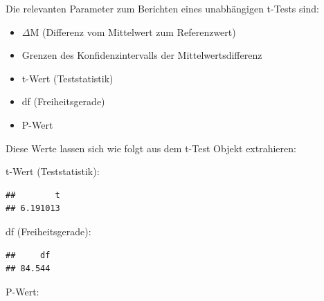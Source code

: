 \documentclass[
]{book}
\newenvironment{Shaded}{\begin{snugshade}}{\end{snugshade}}
\newcommand{\AttributeTok}[1]{\textcolor[rgb]{0.77,0.63,0.00}{#1}}
\newcommand{\FunctionTok}[1]{\textcolor[rgb]{0.00,0.00,0.00}{#1}}
\newcommand{\NormalTok}[1]{#1}
\newcommand{\SpecialCharTok}[1]{\textcolor[rgb]{0.00,0.00,0.00}{#1}}
\providecommand{\tightlist}{%
  \setlength{\itemsep}{0pt}\setlength{\parskip}{0pt}}
\begin{document}
Die relevanten Parameter zum Berichten eines unabhängigen t-Tests sind:

\begin{itemize}
\tightlist
\item
  \(\Delta\)M (Differenz vom Mittelwert zum Referenzwert)
\item
  Grenzen des Konfidenzintervalls der Mittelwertsdifferenz
\item
  t-Wert (Teststatistik)
\item
  df (Freiheitsgerade)
\item
  P-Wert
\end{itemize}

Diese Werte lassen sich wie folgt aus dem t-Test Objekt extrahieren:

t-Wert (Teststatistik):

\begin{Shaded}
\end{Shaded}

\begin{verbatim}
##        t 
## 6.191013
\end{verbatim}

df (Freiheitsgerade):

\begin{Shaded}
\end{Shaded}

\begin{verbatim}
##     df 
## 84.544
\end{verbatim}

P-Wert:

\begin{Shaded}
\end{Shaded}
\end{document}
